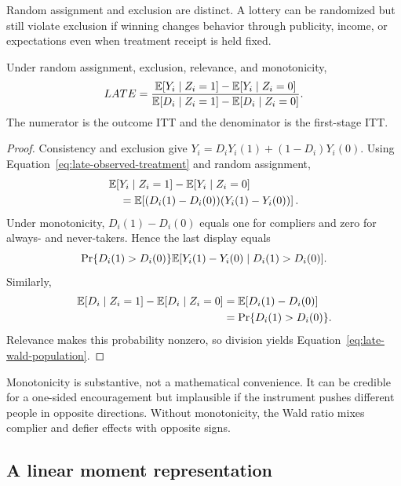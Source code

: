 Random assignment and exclusion are distinct.  A lottery can be randomized but
still violate exclusion if winning changes behavior through publicity, income,
or expectations even when treatment receipt is held fixed.

\begin{theorem}
Under random assignment, exclusion, relevance, and monotonicity,
\begin{equation}
  LATE=
  \frac{\mathbb{E}[Y_i\mid Z_i=1]-\mathbb{E}[Y_i\mid Z_i=0]}
       {\mathbb{E}[D_i\mid Z_i=1]-\mathbb{E}[D_i\mid Z_i=0]}.
  \label{eq:late-wald-population}
\end{equation}
The numerator is the outcome ITT and the denominator is the first-stage ITT.
\end{theorem}

\begin{proof}
Consistency and exclusion give
$Y_i=D_iY_i(1)+(1-D_i)Y_i(0)$.  Using
Equation~\eqref{eq:late-observed-treatment} and random assignment,
\begin{align*}
  &\mathbb{E}[Y_i\mid Z_i=1]-\mathbb{E}[Y_i\mid Z_i=0]\\
  &\quad=\mathbb{E}\!\left[(D_i(1)-D_i(0))
                     (Y_i(1)-Y_i(0))\right].
\end{align*}
Under monotonicity, $D_i(1)-D_i(0)$ equals one for compliers and zero for
always- and never-takers.  Hence the last display equals
\[
  \Pr\{D_i(1)>D_i(0)\}
  \mathbb{E}[Y_i(1)-Y_i(0)\mid D_i(1)>D_i(0)].
\]
Similarly,
\begin{align*}
  \mathbb{E}[D_i\mid Z_i=1]-\mathbb{E}[D_i\mid Z_i=0]
  &=\mathbb{E}[D_i(1)-D_i(0)]\\
  &=\Pr\{D_i(1)>D_i(0)\}.
\end{align*}
Relevance makes this probability nonzero, so division yields
Equation~\eqref{eq:late-wald-population}.
\end{proof}

Monotonicity is substantive, not a mathematical convenience.  It can be
credible for a one-sided encouragement but implausible if the instrument pushes
different people in opposite directions.  Without monotonicity, the Wald ratio
mixes complier and defier effects with opposite signs.

\subsection{A linear moment representation}
\label{sec:late-linear}

